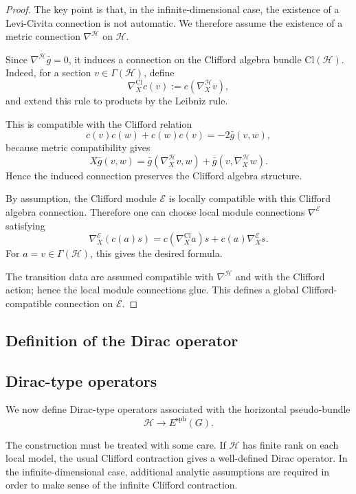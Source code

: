\documentclass[11pt]{amsart}
\begin{document}
\begin{proof}
The key point is that, in the infinite-dimensional case, the existence of a
Levi-Civita connection is not automatic. We therefore assume the existence of
a metric connection \(\nabla^{\mathcal H}\) on \(\mathcal H\).

Since \(\nabla^{\mathcal H}\bar g=0\), it induces a connection on the Clifford
algebra bundle \(\mathrm{Cl}(\mathcal H)\). Indeed, for a section
\(v\in\Gamma(\mathcal H)\), define
\[
\nabla^{\mathrm{Cl}}_X c(v):=
c(\nabla^{\mathcal H}_Xv),
\]
and extend this rule to products by the Leibniz rule.

This is compatible with the Clifford relation
\[
c(v)c(w)+c(w)c(v)=-2\bar g(v,w),
\]
because metric compatibility gives
\[
X\bar g(v,w)
=
\bar g(\nabla^{\mathcal H}_Xv,w)
+
\bar g(v,\nabla^{\mathcal H}_Xw).
\]
Hence the induced connection preserves the Clifford algebra structure.

By assumption, the Clifford module \(\mathcal E\) is locally compatible with
this Clifford algebra connection. Therefore one can choose local module
connections \(\nabla^{\mathcal E}\) satisfying
\[
\nabla^{\mathcal E}_X(c(a)s)
=
c(\nabla^{\mathrm{Cl}}_Xa)s
+
c(a)\nabla^{\mathcal E}_Xs.
\]
For \(a=v\in\Gamma(\mathcal H)\), this gives the desired formula.

The transition data are assumed compatible with \(\nabla^{\mathcal H}\) and
with the Clifford action; hence the local module connections glue. This
defines a global Clifford-compatible connection on \(\mathcal E\).
\end{proof}
\subsection{Definition of the Dirac operator}

\subsection{Dirac-type operators}

We now define Dirac-type operators associated with the horizontal pseudo-bundle
\[
\mathcal H\to E^{\mathrm{sph}}(G).
\]

The construction must be treated with some care. If \(\mathcal H\) has finite
rank on each local model, the usual Clifford contraction gives a well-defined
Dirac operator. In the infinite-dimensional case, additional analytic
assumptions are required in order to make sense of the infinite Clifford
contraction.
\end{document}
